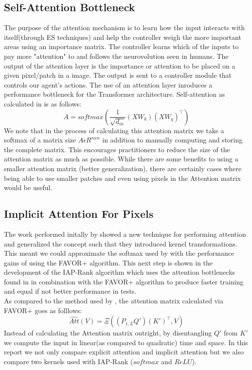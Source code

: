 \documentclass[10pt,twocolumn,letterpaper]{article}
\begin{document}
\subsection{Self-Attention Bottleneck}
The purpose of the attention mechanism is to learn how the input interacts with itself(through
ES techniques)
and help the controller weigh the more important areas using an importance matrix.
The controller learns which of the inputs to pay more "attention" to and follows the 
neurovolution seen in humans. The output of the attention layer 
is the importance or attention to be placed on a given pixel/patch in a image. The output
is sent to a controller module that controls our agent's actions. The use of an 
attention layer 
inroduces a performance bottleneck for the Transformer architecture. Self-attention as 
calculated in \cite{Tang} is as follows:
$$ A = softmax(\frac{1}{\sqrt{d_{in}}} (XW_k)(XW_q)^\top) $$
We note that in the process of calculating this attention matrix we take a softmax of a matrix size 
$A   \epsilon  R^{n x n}$ in addition to manually computing and storing the complete 
matrix. This encourages practitioners to reduce the size of the attention matrix as much 
as possible. While there are some benefits to using a smaller attention matrix (better generalization),
there are certainly cases where being able to use smaller patches and even using pixels in the Attention
matrix would be useful.

\subsection{Implicit Attention For Pixels}
The work performed initally by \cite{Performers} showed a new technique for performing attention and 
generalized the concept such that they introduced kernel transformations. This meant we could approximate 
the softmax used by \cite{Tang} with the performance gains of using the FAVOR+ algorithm. This next step is 
shown in the development of the IAP-Rank algorithm which uses the attention bottlenecks found in \cite{Tang}
in combination with the FAVOR+ algorithm to produce faster training and equal if not better performance in tests. \\
As compared to the method used by \cite{Tang}, the attention matrix calculated via 
FAVOR+ goes as folllows:\\
$$\hat{Att}(V) = \Xi ((P_{1,L}Q')(K')^\intercal,V)$$
Instead of calculating the Attention matrix outright, by disentangling $Q'$ from $K'$ we 
compute the input in linear(as compared to quadratic) time and space. In this report we
not only compare explicit attention and implicit attention but we also compare two 
kernels used with IAP-Rank ($softmax$ and $ReLU$).
\end{document}
